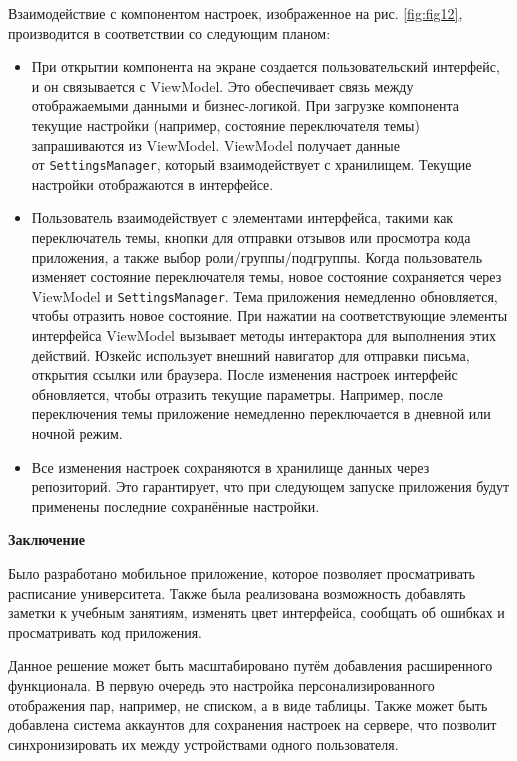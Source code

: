 \documentclass{vsureport}
\begin{document}
Взаимодействие с компонентом настроек, изображенное на рис. \ref{fig:fig12}, производится в соответствии со следующим планом:
\begin{itemize}
    \item При открытии компонента на экране создается пользовательский интерфейс, и он связывается с ViewModel. Это обеспечивает связь между отображаемыми данными и бизнес-логикой. При загрузке компонента текущие настройки (например, состояние переключателя темы) запрашиваются из ViewModel. ViewModel получает данные \\ от \texttt{SettingsManager}, который взаимодействует с хранилищем. Текущие настройки отображаются в интерфейсе.
    \item Пользователь взаимодействует с элементами интерфейса, такими как переключатель темы, кнопки для отправки отзывов или просмотра кода приложения, а также выбор роли/группы/подгруппы. Когда пользователь изменяет состояние переключателя темы, новое состояние сохраняется через ViewModel и \texttt{SettingsManager}. Тема приложения немедленно обновляется, чтобы отразить новое состояние. При нажатии на соответствующие элементы интерфейса ViewModel вызывает методы интерактора для выполнения этих действий. Юзкейс использует внешний навигатор для отправки письма, открытия ссылки или браузера. После изменения настроек интерфейс обновляется, чтобы отразить текущие параметры. Например, после переключения темы приложение немедленно переключается в дневной или ночной режим.
    \item Все изменения настроек сохраняются в хранилище данных через репозиторий. Это гарантирует, что при следующем запуске приложения будут применены последние сохранённые настройки.
\end{itemize}

\newpage
\begin{center}
	\textbf{Заключение}
\end{center}

Было разработано мобильное приложение, которое позволяет просматривать расписание университета. Также была реализована возможность добавлять заметки к учебным занятиям, изменять цвет интерфейса, сообщать об ошибках и просматривать код приложения.

Данное решение может быть масштабировано путём добавления расширенного функционала. В первую очередь это настройка персонализированного отображения пар, например, не списком, а в виде таблицы. Также может быть добавлена система аккаунтов для сохранения настроек на сервере, что позволит синхронизировать их между устройствами одного пользователя.
\end{document}
